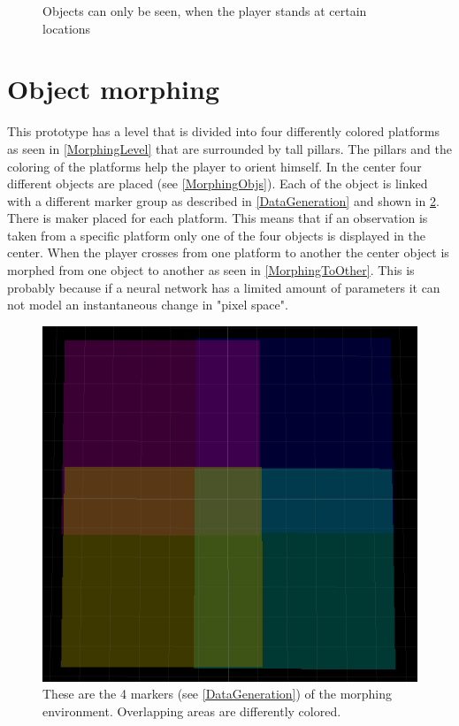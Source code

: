 \begin{figure}[p]
  \caption{Objects can only be seen, when the player stands at certain locations}
  \label{WalkingSim}
\end{figure}


\section{Object morphing}
This prototype has a level that is divided into four differently colored platforms as seen in \cref{MorphingLevel} that are surrounded by tall pillars. The pillars and the coloring of the platforms help the player to orient himself. In the center four different objects are placed (see \cref{MorphingObjs}). Each of the object is linked with a different marker group as described in \cref{DataGeneration} and shown in \cref{MorphingMarkers}. There is maker placed for each platform. This means that if an observation is taken from a specific platform only one of the four objects is displayed in the center. When the player crosses from one platform to another the center object is morphed from one object to another as seen in \cref{MorphingToOther}. This is probably because if a neural network has a limited amount of parameters it can not model an instantaneous change in "pixel space".

\begin{figure}[p]
  \centering
  \includegraphics[width=\imgWidth]{images/workflow/object_morphing/CaptureAreas.png}
  \caption{These are the 4 markers (see \cref{DataGeneration}) of the morphing environment. Overlapping areas are differently colored.}
  \label{MorphingMarkers}
\end{figure}

